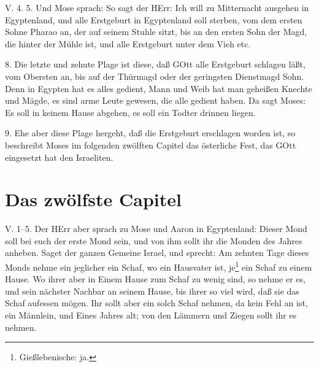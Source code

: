 \begin{schriftzitat}
V. 4. 5. Und Mose sprach: So sagt der HErr: Ich will zu Mitternacht ausgehen in Egyptenland, und alle Erstgeburt in Egyptenland soll sterben, vom dem ersten Sohne Pharao an, der auf seinem Stuhle sitzt, bis an den ersten Sohn der Magd, die hinter der Mühle ist, und alle Erstgeburt unter dem Vieh etc.
\end{schriftzitat}

8. Die letzte und zehute Plage ist diese, daß GOtt alle Erstgeburt schlagen läßt, vom Obersten an, bis auf der Thürmagd oder der geringsten Dienstmagd Sohn. Denn in Egypten hat es alles gedient, Mann und Weib hat man geheißen Knechte und Mägde, es sind arme Leute gewesen, die alle gedient haben. Da sagt Moses: Es soll in keinem Hause abgehen, es soll ein Todter drinnen liegen.

9. Ehe aber diese Plage hergeht, daß die Erstgeburt erschlagen worden ist, so beschreibt Moses im folgenden zwölften Capitel das österliche Fest, das GOtt eingesetzt hat den Israeliten.

\section{Das zwölfste Capitel}

\begin{schriftzitat}
V. 1–5. Der HErr aber sprach zu Mose und Aaron in Egyptenland: Dieser Mond soll bei euch der erste Mond sein, und von ihm sollt ihr die Monden des Jahres anheben. Saget der ganzen Gemeine Israel, und sprecht: Am zehnten Tage dieses Monds nehme ein jeglicher ein Schaf, wo ein Hausvater ist, je\footnote{Gießlebenische: ja.} ein Schaf zu einem Hause. Wo ihrer aber in Einem Hause zum Schaf zu wenig sind, so nehme er es, und sein nächster Nachbar an seinem Hause, bis ihrer so viel wird, daß sie das Schaf aufessen mögen. Ihr sollt aber ein solch Schaf nehmen, da kein Fehl an ist, ein Männlein, und Eines Jahres alt; von den Lämmern und Ziegen sollt ihr es nehmen.
\end{schriftzitat}

